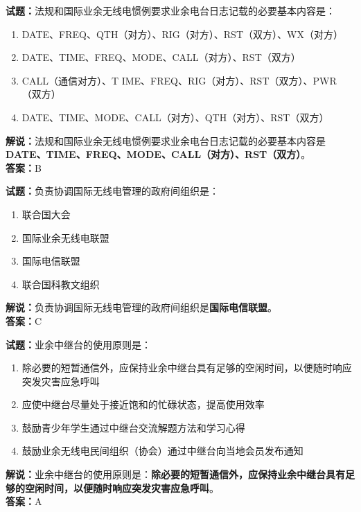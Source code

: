 \documentclass{ctexbook}
\begin{document}
\vspace{1em}

\textbf{试题：}法规和国际业余无线电惯例要求业余电台日志记载的必要基本内容是：
\begin{enumerate}[leftmargin=3em]
  \item DATE、FREQ、QTH（对方）、RIG（对方）、RST（双方）、WX（对方）
  \item DATE、TIME、FREQ、MODE、CALL（对方）、RST（双方）
  \item CALL（通信对方）、T IME、FREQ、RIG（对方）、RST（双方）、PWR（双方）
  \item DATE、TIME、MODE、CALL（对方）、QTH（对方）、RST（双方）
\end{enumerate}
\noindent\textbf{解说：}法规和国际业余无线电惯例要求业余电台日志记载的必要基本内容是\textbf{DATE、TIME、FREQ、MODE、CALL（对方）、RST（双方）}。\\\noindent\textbf{答案：}B

\vspace{1em}

\textbf{试题：}负责协调国际无线电管理的政府间组织是：
\begin{enumerate}[leftmargin=3em]
  \item 联合国大会
  \item 国际业余无线电联盟
  \item 国际电信联盟
  \item 联合国科教文组织
\end{enumerate}
\noindent\textbf{解说：}负责协调国际无线电管理的政府间组织是\textbf{国际电信联盟}。\\\noindent\textbf{答案：}C

\vspace{1em}

\textbf{试题：}业余中继台的使用原则是：
\begin{enumerate}[leftmargin=3em]
  \item 除必要的短暂通信外，应保持业余中继台具有足够的空闲时间，以便随时响应突发灾害应急呼叫
  \item 应使中继台尽量处于接近饱和的忙碌状态，提高使用效率
  \item 鼓励青少年学生通过中继台交流解题方法和学习心得
  \item 鼓励业余无线电民间组织（协会）通过中继台向当地会员发布通知
\end{enumerate}
\noindent\textbf{解说：}业余中继台的使用原则是：\textbf{除必要的短暂通信外，应保持业余中继台具有足够的空闲时间，以便随时响应突发灾害应急呼叫}。\\\noindent\textbf{答案：}A
\end{document}
